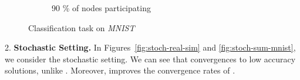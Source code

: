 \documentclass[10pt]{article}
\begin{document}
\begin{figure}[H]
\begin{subfigure}{.33\textwidth}
        \caption{90 \% of nodes participating}
    \end{subfigure}
    \caption{Classification task on \textit{MNIST}}
\label{fig:finite-sum-mnist}
\end{figure}


\vspace{-0.3cm}
{2. \bf Stochastic Setting.} In Figures~\ref{fig:stoch-real-sim} and \ref{fig:stoch-sum-mnist}, we consider the stochastic setting. We can see that  convergences to low accuracy solutions, unlike . Moreover,  improves the convergence rates of .
\end{document}

